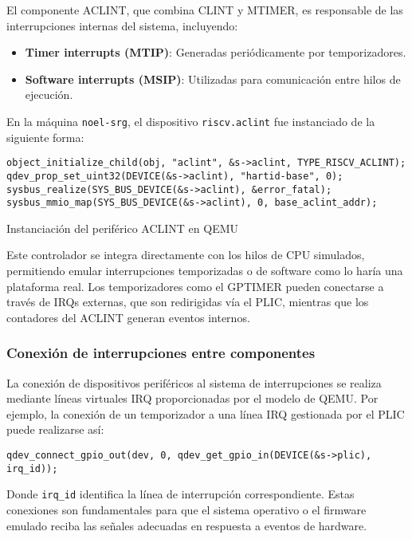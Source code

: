 El componente ACLINT, que combina CLINT y MTIMER, es responsable de las interrupciones internas del sistema, incluyendo:

\begin{itemize}
    \item \textbf{Timer interrupts (MTIP)}: Generadas periódicamente por temporizadores.
    \item \textbf{Software interrupts (MSIP)}: Utilizadas para comunicación entre hilos de ejecución.
\end{itemize}

En la máquina \texttt{noel-srg}, el dispositivo \texttt{riscv.aclint} fue instanciado de la siguiente forma:

\begin{codefloat}
\begin{lstlisting}[style=CppExample]
object_initialize_child(obj, "aclint", &s->aclint, TYPE_RISCV_ACLINT);
qdev_prop_set_uint32(DEVICE(&s->aclint), "hartid-base", 0);
sysbus_realize(SYS_BUS_DEVICE(&s->aclint), &error_fatal);
sysbus_mmio_map(SYS_BUS_DEVICE(&s->aclint), 0, base_aclint_addr);
\end{lstlisting}
\caption{Instanciación del periférico ACLINT en QEMU}
\end{codefloat}

Este controlador se integra directamente con los hilos de CPU simulados, permitiendo emular interrupciones temporizadas o de software como lo haría una plataforma real. Los temporizadores como el GPTIMER pueden conectarse a través de IRQs externas, que son redirigidas vía el PLIC, mientras que los contadores del ACLINT generan eventos internos.

\subsubsection*{Conexión de interrupciones entre componentes}

La conexión de dispositivos periféricos al sistema de interrupciones se realiza mediante líneas virtuales IRQ proporcionadas por el modelo de QEMU. Por ejemplo, la conexión de un temporizador a una línea IRQ gestionada por el PLIC puede realizarse así:

\begin{verbatim}
qdev_connect_gpio_out(dev, 0, qdev_get_gpio_in(DEVICE(&s->plic), irq_id));
\end{verbatim}

Donde \texttt{irq\_id} identifica la línea de interrupción correspondiente. Estas conexiones son fundamentales para que el sistema operativo o el firmware emulado reciba las señales adecuadas en respuesta a eventos de hardware.


